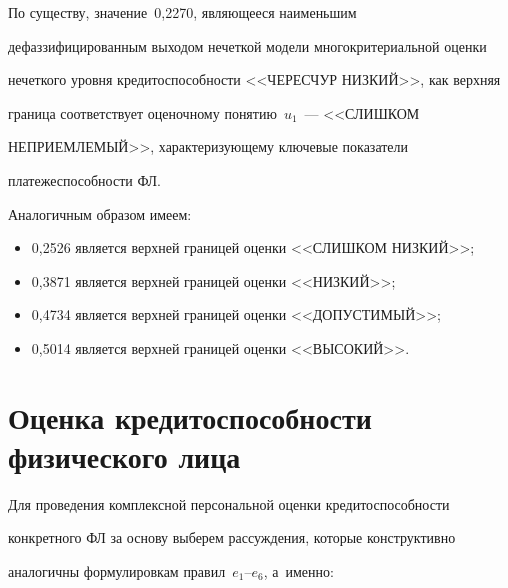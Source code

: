   По существу, значение~0,2270, являющееся наименьшим 

дефаззифицированным выходом нечеткой модели многокритериальной оценки 

нечеткого уровня кредитоспособности <<ЧЕРЕСЧУР НИЗКИЙ>>, как верхняя 

граница соответствует оценочному понятию~$u_1$~--- <<СЛИШКОМ 

НЕПРИЕМЛЕМЫЙ>>, характеризующему ключевые показатели 

платежеспособности ФЛ. 



Аналогичным образом имеем: 

  \begin{itemize}

\item 0,2526 является верхней границей оценки <<СЛИШКОМ НИЗКИЙ>>; 

\item 0,3871 является верхней границей оценки <<НИЗКИЙ>>; 

\item 0,4734 является верхней границей оценки <<ДОПУСТИМЫЙ>>; 

\item 0,5014 является верхней границей оценки <<ВЫСОКИЙ>>. 

\end{itemize}



\section{Оценка кредитоспособности физического лица}



  Для проведения комплексной персональной оценки кредитоспособности 

конкретного ФЛ за основу выберем рассуждения, которые конструктивно 

аналогичны формулировкам правил~$e_1$--$e_6$, а~именно: 

